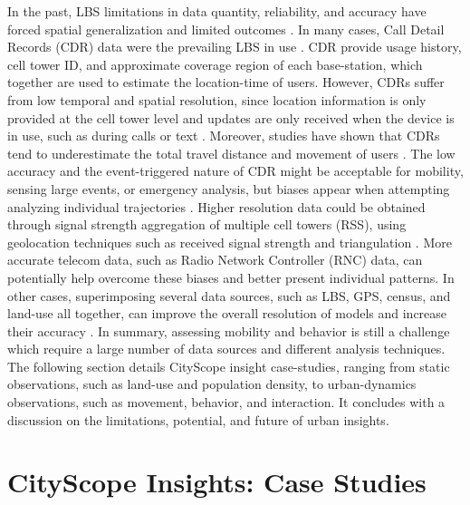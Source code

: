 {  {
      In the past, LBS limitations in data quantity, reliability, and accuracy have forced spatial generalization and limited outcomes \cite{candia2008uncovering}. In many cases, Call Detail Records (CDR) data were the prevailing LBS in use \cite{jiang2017activity}. CDR provide usage history, cell tower ID, and approximate coverage region of each base-station, which together are used to estimate the location-time of users. However, CDRs suffer from low temporal and spatial resolution, since location information is only provided at the cell tower level and updates are only received when the device is in use, such as during calls or text \cite{Calabrese2014}. Moreover, studies have shown that CDRs tend to underestimate the total travel distance and movement of users \cite{VonMorner2017}. The low accuracy and the event-triggered nature of CDR might be acceptable for mobility, sensing large events, or emergency analysis, but biases appear when attempting analyzing individual trajectories \cite{Zhao2016}. Higher resolution data could be obtained through signal strength aggregation of multiple cell towers (RSS), using geolocation techniques such as received signal strength and triangulation \cite{blondel2015survey}. More accurate telecom data, such as Radio Network Controller (RNC) data, can potentially help overcome these biases and better present individual patterns. In other cases, superimposing several data sources, such as LBS, GPS, census, and land-use all together, can improve the overall resolution of models and increase their accuracy \cite{Blondel2015}.
  }
  \newline
  In summary, assessing mobility and behavior is still a challenge which require a large number of data sources and different analysis techniques. The following section details CityScope insight case-studies, ranging from static observations, such as land-use and population density, to urban-dynamics observations, such as movement, behavior, and interaction. It concludes with a discussion on the limitations, potential, and future of urban insights.
 }


\section{CityScope Insights: Case Studies}


